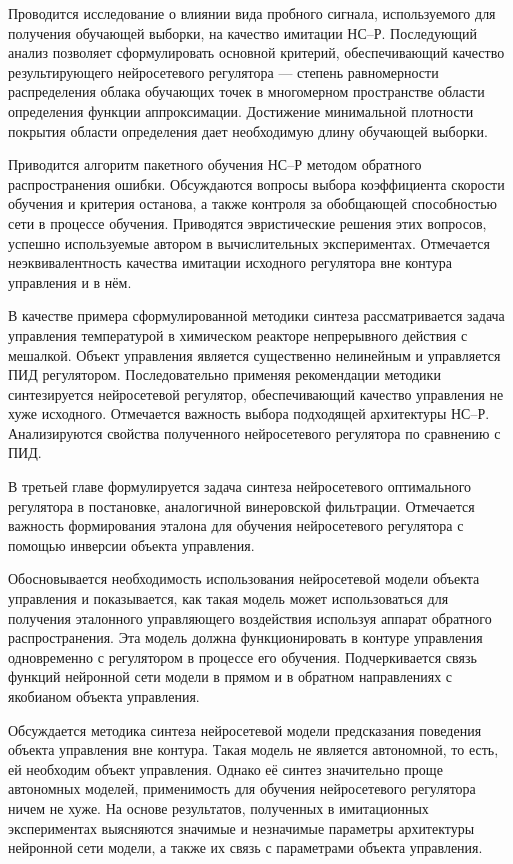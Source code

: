 Проводится исследование о влиянии вида пробного сигнала, используемого
для получения обучающей выборки, на качество имитации НС--Р.
Последующий анализ позволяет сформулировать основной критерий,
обеспечивающий качество результирующего нейросетевого регулятора ---
степень равномерности распределения облака обучающих точек в
многомерном пространстве области определения функции аппроксимации.
Достижение минимальной плотности покрытия области определения дает
необходимую длину обучающей выборки.

Приводится алгоритм пакетного обучения НС--Р методом обратного
распространения ошибки.  Обсуждаются вопросы выбора коэффициента
скорости обучения и критерия останова, а также контроля за обобщающей
способностью сети в процессе обучения.  Приводятся эвристические
решения этих вопросов, успешно используемые автором в вычислительных
экспериментах.  Отмечается неэквивалентность качества имитации
исходного регулятора вне контура управления и в нём.

В качестве примера сформулированной методики синтеза рассматривается
задача управления температурой в химическом реакторе непрерывного
действия с мешалкой.  Объект управления является существенно
нелинейным и управляется ПИД регулятором.  Последовательно применяя
рекомендации методики синтезируется нейросетевой регулятор,
обеспечивающий качество управления не хуже исходного.  Отмечается
важность выбора подходящей архитектуры НС--Р.  Анализируются свойства
полученного нейросетевого регулятора по сравнению с ПИД.


В третьей главе формулируется задача синтеза нейросетевого
оптимального регулятора в постановке, аналогичной винеровской
фильтрации.  Отмечается важность формирования эталона для обучения
нейросетевого регулятора с помощью инверсии объекта управления.

Обосновывается необходимость использования нейросетевой модели объекта
управления и показывается, как такая модель может использоваться для
получения эталонного управляющего воздействия используя аппарат
обратного распространения.  Эта модель должна функционировать в
контуре управления одновременно с регулятором в процессе его обучения.
Подчеркивается связь функций нейронной сети модели в прямом и в
обратном направлениях с якобианом объекта управления.

Обсуждается методика синтеза нейросетевой модели предсказания
поведения объекта управления вне контура.  Такая модель не является
автономной, то есть, ей необходим объект управления.  Однако её синтез
значительно проще автономных моделей, применимость для обучения
нейросетевого регулятора ничем не хуже.  На основе результатов,
полученных в имитационных экспериментах выясняются значимые и
незначимые параметры архитектуры нейронной сети модели, а также их
связь с параметрами объекта управления.

